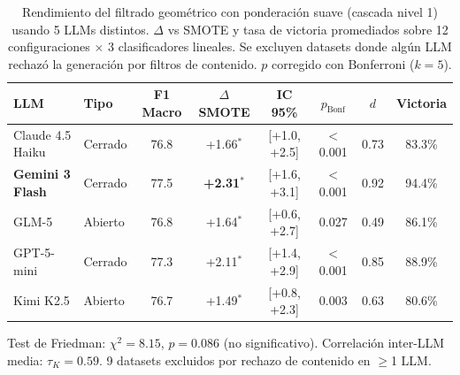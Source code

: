 \begin{table}[htbp]
\centering
\small
\caption{Rendimiento del filtrado geom\'etrico con ponderaci\'on suave (cascada nivel 1) usando 5 LLMs distintos. $\Delta$ vs SMOTE y tasa de victoria promediados sobre 12 configuraciones $\times$ 3 clasificadores lineales. Se excluyen datasets donde alg\'un LLM rechaz\'o la generaci\'on por filtros de contenido. $p$ corregido con Bonferroni ($k=5$).}
\label{tab:multi_llm}
\begin{tabular}{llcccccc}
\toprule
\textbf{LLM} & \textbf{Tipo} & \textbf{F1 Macro} & \textbf{$\Delta$ SMOTE} & \textbf{IC 95\%} & \textbf{$p_{\text{Bonf}}$} & \textbf{$d$} & \textbf{Victoria} \\
\midrule
Claude 4.5 Haiku & Cerrado & 76.8 & +1.66$^{*}$ & [+1.0, +2.5] & $<$0.001 & 0.73 & 83.3\% \\
\textbf{Gemini 3 Flash} & Cerrado & 77.5 & \textbf{+2.31}$^{*}$ & [+1.6, +3.1] & $<$0.001 & 0.92 & 94.4\% \\
GLM-5 & Abierto & 76.8 & +1.64$^{*}$ & [+0.6, +2.7] & 0.027 & 0.49 & 86.1\% \\
GPT-5-mini & Cerrado & 77.3 & +2.11$^{*}$ & [+1.4, +2.9] & $<$0.001 & 0.85 & 88.9\% \\
Kimi K2.5 & Abierto & 76.7 & +1.49$^{*}$ & [+0.8, +2.3] & 0.003 & 0.63 & 80.6\% \\
\bottomrule
\end{tabular}
\par\smallskip
{\small Test de Friedman: $\chi^2 = 8.15$, $p = 0.086$ (no significativo). Correlaci\'on inter-LLM media: $\tau_K = 0.59$. 9 datasets excluidos por rechazo de contenido en $\geq$1 LLM.}
\end{table}